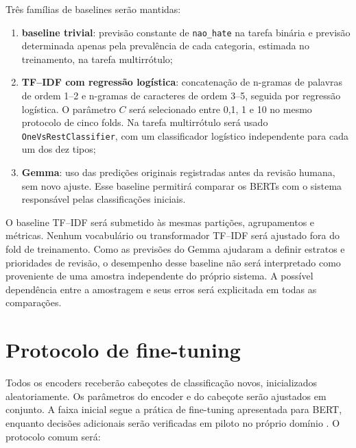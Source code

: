 Três famílias de baselines serão mantidas:

\begin{enumerate}
    \item \textbf{baseline trivial}: previsão constante de \texttt{nao\_hate}
    na tarefa binária e previsão determinada apenas pela prevalência de cada
    categoria, estimada no treinamento, na tarefa multirrótulo;
    \item \textbf{TF--IDF com regressão logística}: concatenação de n-gramas de
    palavras de ordem 1--2 e n-gramas de caracteres de ordem 3--5, seguida por
    regressão logística. O parâmetro $C$ será selecionado entre 0,1, 1 e 10 no
    mesmo protocolo de cinco folds. Na tarefa multirrótulo será usado
    \texttt{OneVsRestClassifier}, com um classificador logístico independente
    para cada um dos dez tipos;
    \item \textbf{Gemma}: uso das predições originais registradas antes da
    revisão humana, sem novo ajuste. Esse baseline permitirá comparar os BERTs
    com o sistema responsável pelas classificações iniciais.
\end{enumerate}

O baseline TF--IDF será submetido às mesmas partições, agrupamentos e métricas.
Nenhum vocabulário ou transformador TF--IDF será ajustado fora do fold de
treinamento. Como as previsões do Gemma ajudaram a definir estratos e prioridades
de revisão, o desempenho desse baseline não será interpretado como proveniente
de uma amostra independente do próprio sistema. A possível dependência entre a
amostragem e seus erros será explicitada em todas as comparações.

\section{Protocolo de fine-tuning}
\label{sec:fine-tuning}

Todos os encoders receberão cabeçotes de classificação novos, inicializados
aleatoriamente. Os parâmetros do encoder e do cabeçote serão ajustados em
conjunto. A faixa inicial segue a prática de fine-tuning apresentada para BERT,
enquanto decisões adicionais serão verificadas em piloto no próprio domínio
\cite{devlin2019bert}. O protocolo comum será:

